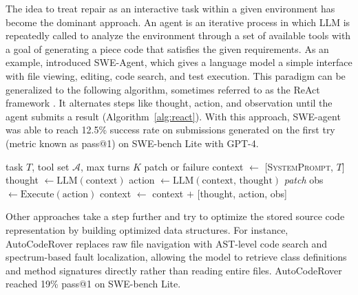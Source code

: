 The idea to treat repair as an interactive task within a given environment has become the dominant approach. 
An agent is an iterative process in which LLM is repeatedly called to analyze the environment through a set of available tools with a goal of generating
a piece code that satisfies the given requirements.
As an example, \citet{yang2024sweagent} introduced SWE-Agent, which gives a language model a simple interface with file viewing, editing,
code search, and test execution.
This paradigm can be generalized to the following algorithm, sometimes referred to as the ReAct framework \citep{yao2022react}.
It alternates steps like thought, action, and observation until the agent submits a result (Algorithm~\ref{alg:react}).
With this approach, SWE-agent was able to reach 12.5\% success rate on submissions generated on the first try (metric known as pass@1) on SWE-bench Lite with GPT-4.

\begin{algorithm}[ht]
\caption{ReAct agent loop, the basis of interactive SWE agents \citep{yao2022react}.}
\label{alg:react}
\begin{algorithmic}[1]
\Require task $T$, tool set $\mathcal{A}$, max turns $K$
\Ensure patch or failure
\State context $\gets$ [\textsc{SystemPrompt}, $T$]
    \State thought $\gets \text{LLM}(\text{context})$ 
    \State action $\gets \text{LLM}(\text{context, thought})$ 
        \Return \textit{patch}
    \EndIf
    \State obs $\gets \text{Execute}(\text{action})$ 
    \State context $\gets$ context $+$ [thought, action, obs]
\EndFor 
\State {}
\end{algorithmic}
\end{algorithm}

Other approaches take a step further and try to optimize the stored source code representation by building optimized data structures.
For instance, AutoCodeRover \citet{zhang2024autocoderover} replaces raw file navigation with AST-level code search and spectrum-based fault localization,
allowing the model to retrieve class definitions and method signatures directly rather than reading entire files.
AutoCodeRover reached 19\% pass@1 on SWE-bench Lite.

